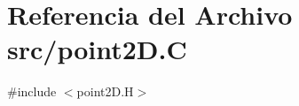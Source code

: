 \hypertarget{point2_d_8_c}{}\section{Referencia del Archivo src/point2D.C}
\label{point2_d_8_c}
{\ttfamily \#include $<$point2\+D.\+H$>$}\newline
